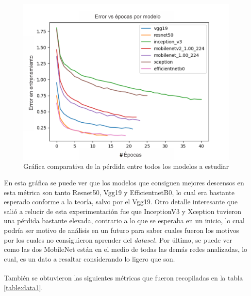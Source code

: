 \begin{figure}[h!]
\includegraphics[width=1\textwidth]{images/loss1.png}
\centering
\caption{Gráfica comparativa de la pérdida entre todos los modelos a estudiar}
\label{fig:losses1}
\end{figure}


En esta gráfica se puede ver que los modelos que consiguen mejores descensos en esta 
métrica son tanto Resnet50, Vgg19 y EfficientnetB0, lo cual era bastante esperado conforme 
a la teoría, salvo por el Vgg19. Otro detalle interesante que salió a relucir de esta 
experimentación fue que InceptionV3 y Xception tuvieron una pérdida bastante elevada, 
contrario a lo que se esperaba en un inicio, lo cual podría ser motivo de análisis en un 
futuro para saber cuales fueron los motivos por los cuales no consiguieron aprender del 
\textit{dataset}. Por último, se puede ver como las dos MobileNet están en el medio de 
todas las demás redes analizadas, lo cual, es un dato a resaltar considerando lo ligero que 
son. \\\\

También se obtuvieron las siguientes métricas que fueron recopiladas en la tabla \ref{table:data1}.

